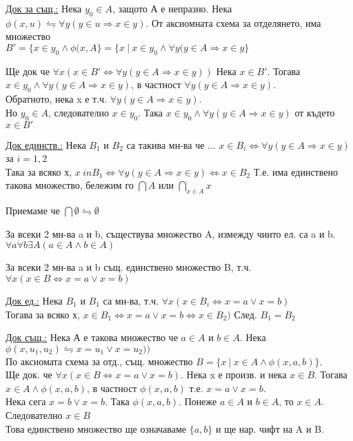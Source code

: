 \documentclass[fleqn, titlepage, 12pt]{report}
\begin{document}
\underline{Док за същ.:} Нека $y_0 \in A$, защото А е непразно. Нека
$\phi(x,u) \leftrightharpoons \forall{y}(y \in u \Rightarrow x \in y)$.
От аксиомната схема за отделянето, има множество\\
$B' = \{x \in y_0 \land \phi(x,A\} = \{x\ |\ x\in y_0 \land \forall{y}(y \in A \Rightarrow x \in y\}$

Ще док че $\forall{x}(x \in B' \Leftrightarrow \forall{y}(y \in A \Rightarrow x \in y))$
Нека $x \in B'$. Тогава $x \in y_0 \land \forall{y}(y \in A \Rightarrow x \in y)$,
в частност $ \forall{y}(y \in A \Rightarrow x \in y)$.\\
Обратното, нека x е т.ч. $ \forall{y}(y \in A  \Rightarrow x \in y)$.\\
Но $y_0 \in A$, следователно $x \in y_0$. Така $x \in y_0 \land \forall{y}(y \in A \Rightarrow x \in y)$
от където $x \in B'$
\bigbreak

\underline{Док единств.:} Нека $B_1$ и $B_2$ са такива мн-ва че ... $ x \in B_i \Leftrightarrow \forall{y}(y \in A \Rightarrow x \in y)$ за $i = 1,2$\\
Така за всяко х, $ x\ in B_1 \Leftrightarrow \forall{y}(y \in A \Rightarrow x \in y) \Leftrightarrow x \in B_2$
Т.е. има единствено такова множество, бележим го $\bigcap A$ или $\bigcap_{x \in A}x$
\bigbreak

Приемаме че $\bigcap\emptyset \leftrightharpoons \emptyset$
\bigbreak

 За всеки 2 мн-ва a и b, съществува множество A, измежду чиито ел. са a и b.\\
$ \forall{a} \forall{b} \exists{A} (a \in A \land b \in A)$
\bigbreak

 За всеки 2 мн-ва a и b същ. единствено множество B, т.ч. $ \forall{x}(x \in B \Leftrightarrow x = a \lor x = b)$
\bigbreak

\underline{Док ед.:} Нека $B_1$ и $B_1$ са мн-ва, т.ч. $ \forall{x}(x \in B_i \Leftrightarrow x = a \lor x = b)$\\
Тогава за всяко х, $x \in B_1 \Leftrightarrow x = a \lor x = b \Leftrightarrow x \in B_2)$
След. $B_1 = B_2$
\bigbreak

\underline{Док същ.:} Нека А е такова множество че $a \in A$ и $ b \in A$. Нека $ \phi(x, u_1, u_2) \leftrightharpoons x = u_1 \lor x = u_2))$\\
По аксиомата схема за отд., същ. множество $B = \{ x\ |\ x \in A \land \phi(x,a,b)\}$.\\
Ще док. че $ \forall{x}(x \in B \Leftrightarrow x = a \lor x = b)$. Нека x е произв. и нека $x \in B$.
Тогава $x \in A \land \phi(x,a,b)$, в частност $ \phi(x,a,b)$ т.е. $x = a \lor x = b$.\\
Нека сега $x = b \lor x = b$. Така $ \phi(x,a,b)$. Понеже $a \in A$ и $b \in A$, то $x \in A$. Следователно $x \in B$\\
Това единствено множество ще означаваме $\{a,b\}$ и ще нар. чифт на A и B.
\bigbreak
\end{document}
